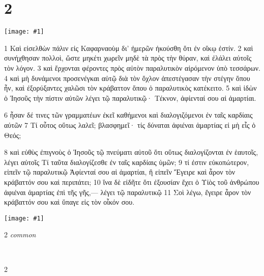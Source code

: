 \documentclass[10pt,a5paper,twoside,twocolumn]{book}
\newcommand{\fig}[1]{\texttt{[image: \#1]}\label{fig:#1}}
\newcommand*\cleartoleftpage{%
  \ifodd\value{page}\hbox{}\clearpage\fi
}
\newcommand{\separator}{\hspace{0.27\textwidth}\noindent\makebox[\linewidth]{\resizebox{0.3333\linewidth}{1pt}{$\bullet$}}\bigskip}
\newenvironment{facing}{\cleartoleftpage}{\clearpage\pagebreak}
\newenvironment{help}{\pagebreak}{}
\newenvironment{helpsec}{\begin{minipage}[t]{\textwidth}\begin{multicols}{2}}{\end{multicols}\end{minipage}}
\newenvironment{vocab}{\begin{helpsec}}{\end{helpsec}}
\newenvironment{translation}{\separator\\\begin{helpsec}\footnotesize}{\end{helpsec}}
\begin{document}

\chapter{2}

\begin{facing}

\fig{02-04} %

	1 Καὶ εἰσελθὼν πάλιν εἰς Καφαρναοὺμ δι’ ἡμερῶν ἠκούσθη ὅτι ἐν οἴκῳ ἐστίν. 2 καὶ συνήχθησαν πολλοὶ, ὥστε μηκέτι χωρεῖν μηδὲ τὰ πρὸς τὴν θύραν, καὶ ἐλάλει αὐτοῖς τὸν λόγον. 3 καὶ ἔρχονται φέροντες πρὸς αὐτὸν παραλυτικὸν αἰρόμενον ὑπὸ τεσσάρων. 4 καὶ μὴ δυνάμενοι προσενέγκαι αὐτῷ διὰ τὸν ὄχλον ἀπεστέγασαν τὴν στέγην ὅπου ἦν, καὶ ἐξορύξαντες χαλῶσι τὸν κράβαττον ὅπου ὁ παραλυτικὸς κατέκειτο. 5 καὶ ἰδὼν ὁ Ἰησοῦς τὴν πίστιν αὐτῶν λέγει τῷ παραλυτικῷ· Τέκνον, ἀφίενταί σου αἱ ἁμαρτίαι.

 6 ἦσαν δέ τινες τῶν γραμματέων ἐκεῖ καθήμενοι καὶ διαλογιζόμενοι ἐν ταῖς καρδίαις αὐτῶν 7 Τί οὗτος οὕτως λαλεῖ; βλασφημεῖ· τίς δύναται ἀφιέναι ἁμαρτίας εἰ μὴ εἷς ὁ Θεός; 

8 καὶ εὐθὺς ἐπιγνοὺς ὁ Ἰησοῦς τῷ πνεύματι αὐτοῦ ὅτι οὕτως διαλογίζονται ἐν ἑαυτοῖς, λέγει αὐτοῖς Τί ταῦτα διαλογίζεσθε ἐν ταῖς καρδίαις ὑμῶν; 9 τί ἐστιν εὐκοπώτερον, εἰπεῖν τῷ παραλυτικῷ Ἀφίενταί σου αἱ ἁμαρτίαι, ἢ εἰπεῖν Ἔγειρε καὶ ἆρον τὸν κράβαττόν σου καὶ περιπάτει; 10 ἵνα δὲ εἰδῆτε ὅτι ἐξουσίαν ἔχει ὁ Υἱὸς τοῦ ἀνθρώπου ἀφιέναι ἁμαρτίας ἐπὶ τῆς γῆς,— λέγει τῷ παραλυτικῷ 11 Σοὶ λέγω, ἔγειρε ἆρον τὸν κράβαττόν σου καὶ ὕπαγε εἰς τὸν οἶκόν σου.

\fig{02-06} %



\begin{help}
\begin{vocab}
\emph{common}\\

\end{vocab}
\begin{translation}

\end{translation}
\end{help}
\end{facing}
\end{document}
